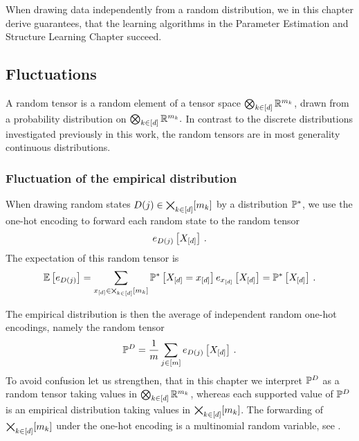 \section{\chatextconcentration}\label{cha:concentration}

When drawing data independently from a random distribution, we in this chapter derive guarantees, that the learning algorithms in the Parameter Estimation and Structure Learning Chapter succeed.

%
	
	
\subsection{Fluctuations}

A random tensor is a random element of a tensor space $\bigotimes_{k\in[d]} \mathbb{R}^{m_{k}}$, drawn from a probability distribution on $\bigotimes_{k\in[d]} \mathbb{R}^{m_{k}}.$
In contrast to the discrete distributions investigated previously in this work, the random tensors are in most generality continuous distributions. %

\subsubsection{Fluctuation of the empirical distribution}

When drawing random states $D(j)\in\bigtimes_{k\in[d]}[m_{k}]$ by a distribution $\mathbb{P}^*$, we use the one-hot encoding to forward each random state to the random tensor
	\[ e_{D(j)}\left[X_{[d]}\right] \, . \]
The expectation of this random tensor is
\begin{align*}
	\mathbb{E}\left[e_{D(j)}\right] 
	= \sum_{x_{[d]}\in\bigtimes_{k\in[d]}[m_{k}]} \mathbb{P}^*\left[X_{[d]}=x_{[d]}\right] e_{x_{[d]}}\left[X_{[d]}\right] 
	= \mathbb{P}^*\left[X_{[d]}\right] \, . 
\end{align*}
	
The empirical distribution is then the average of independent random one-hot encodings, namely the random tensor
	\[ \mathbb{P}^{D} = \frac{1}{m} \sum_{j\in[m]}  e_{D(j)}\left[X_{[d]}\right] \, . \]
To avoid confusion let us strengthen, that in this chapter we interpret $\mathbb{P}^{D}$ as a random tensor taking values in $\bigotimes_{k\in[d]} \mathbb{R}^{m_{k}}$, whereas each supported value of $\mathbb{P}^{D}$ is an empirical distribution taking values in $\bigtimes_{k\in[d]}[m_{k}]$.
The forwarding of $\bigtimes_{k\in[d]}[m_{k}]$ under the one-hot encoding is a multinomial random variable, see .


